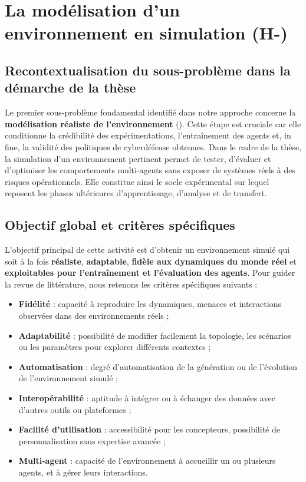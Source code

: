 \section{La modélisation d'un environnement en simulation (H-)}

\subsection*{Recontextualisation du sous-problème dans la démarche de la thèse}

Le premier sous-problème fondamental identifié dans notre approche concerne la \textbf{modélisation réaliste de l’environnement} (). Cette étape est cruciale car elle conditionne la crédibilité des expérimentations, l’entraînement des agents et, in fine, la validité des politiques de cyberdéfense obtenues. Dans le cadre de la thèse, la simulation d’un environnement pertinent permet de tester, d’évaluer et d’optimiser les comportements multi-agents sans exposer de systèmes réels à des risques opérationnels. Elle constitue ainsi le socle expérimental sur lequel reposent les phases ultérieures d’apprentissage, d’analyse et de transfert. \subsection*{Objectif global et critères spécifiques} L’objectif principal de cette activité est d’obtenir un environnement simulé qui soit à la fois \textbf{réaliste}, \textbf{adaptable}, \textbf{fidèle aux dynamiques du monde réel} et \textbf{exploitables pour l’entraînement et l’évaluation des agents}. Pour guider la revue de littérature, nous retenons les critères spécifiques suivants :
%
\begin{itemize}
  \item \textbf{Fidélité} : capacité à reproduire les dynamiques, menaces et interactions observées dans des environnements réels ;
  \item \textbf{Adaptabilité} : possibilité de modifier facilement la topologie, les scénarios ou les paramètres pour explorer différents contextes ;
  \item \textbf{Automatisation} : degré d’automatisation de la génération ou de l’évolution de l’environnement simulé ;
  \item \textbf{Interopérabilité} : aptitude à intégrer ou à échanger des données avec d’autres outils ou plateformes ;
  \item \textbf{Facilité d’utilisation} : accessibilité pour les concepteurs, possibilité de personnalisation sans expertise avancée ;
  \item \textbf{Multi-agent} : capacité de l’environnement à accueillir un ou plusieurs agents, et à gérer leurs interactions.
\end{itemize}

